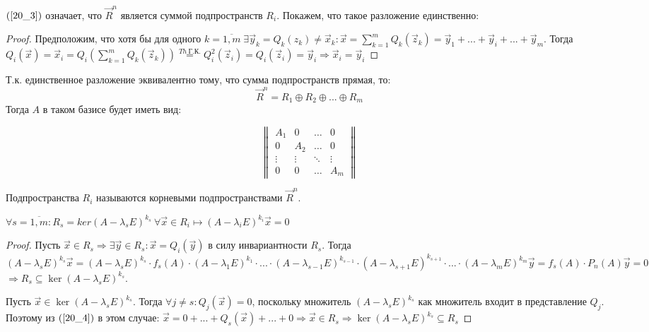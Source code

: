 $(\ref{20_3})$ означает, что $\vec{R}^n$ является суммой подпространств $R_i$. Покажем, что такое разложение единственно:
\begin{proof}
	Предположим, что хотя бы для одного $k = \overline{1,m} \; \exists \vec{y}_k = Q_k(z_k) \neq \vec{x}_k : \vec{x} = \sum\limits_{k=1}^m{Q_k(\vec{z}_k)} = \vec{y}_1 + ... + \vec{y}_i + ... + \vec{y}_m$. Тогда $Q_i(\vec{x}) = \vec{x}_i = Q_i \left(\sum\limits_{k=1}^m{Q_k(\vec{z}_k)}\right) \stackrel{Th~ \text{Г.К.}}{=} Q_i^2(\vec{z}_i) = Q_i(\vec{z}_i) = \vec{y}_i \Rightarrow \vec{x}_i = \vec{y}_i$
\end{proof}

Т.к. единственное разложение эквивалентно тому, что сумма подпространств прямая, то:
\[\vec{R}^n = R_1 \oplus R_2 \oplus ... \oplus R_m\]
Тогда $A$ в таком базисе будет иметь вид:

\begin{equation*}
	\begin{Vmatrix}
		A_1 	 &  0      & \ldots & 0   	 \\
		0      &  A_2    & \ldots & 0   	 \\
		\vdots &  \vdots & \ddots & \vdots \\
		0   	 &   0     & \ldots & A_m
	\end{Vmatrix}
\end{equation*}

Подпространства $R_i$ называются корневыми подпространствами $\vec{R}^n$.

\begin{theorem}
	$\forall s = \overline{1,m} : R_s = ker(A - \lambda_s E)^{k_s}~ \forall \vec{x} \in R_i \longmapsto (A - \lambda_i E)^{k_i} \vec{x} = 0$
	\begin{proof}
		Пусть $\vec{x} \in R_s \Rightarrow \exists \vec{y} \in R_s : \vec{x} = Q_i(\vec{y})$ в силу инвариантности $R_s$. Тогда $(A - \lambda_s E)^{k_s} \vec{x} = (A - \lambda_s E)^{k_s} \cdot f_s(A) \cdot (A - \lambda_1 E)^{k_1} \cdot ... \cdot (A - \lambda_{s-1} E)^{k_{s-1}} \cdot (A - \lambda_{s+1} E)^{k_{s+1}} \cdot ... \cdot (A - \lambda_m E)^{k_m} \vec{y} = f_s(A) \cdot P_n(A)\vec{y} = 0$
		$ \Rightarrow R_s \subseteq \ker(A - \lambda_s E) ^ {k_s}$.
		
		Пусть $\vec{x} \in \ker(A - \lambda_s E)^{k_s}$. Тогда $\forall j \neq s: Q_j(\vec{x}) = 0$, поскольку множитель $(A - \lambda_s E)^{k_s}$ как множитель входит в представление $Q_j$. Поэтому из $(\ref{20_4})$ в этом случае: $\vec{x} = 0 + ... + Q_s(\vec{x}) + ... + 0 \Rightarrow \vec{x} \in R_s \Rightarrow \ker(A-\lambda_s E)^{k_s} \subseteq R_s$
	\end{proof}
\end{theorem}

